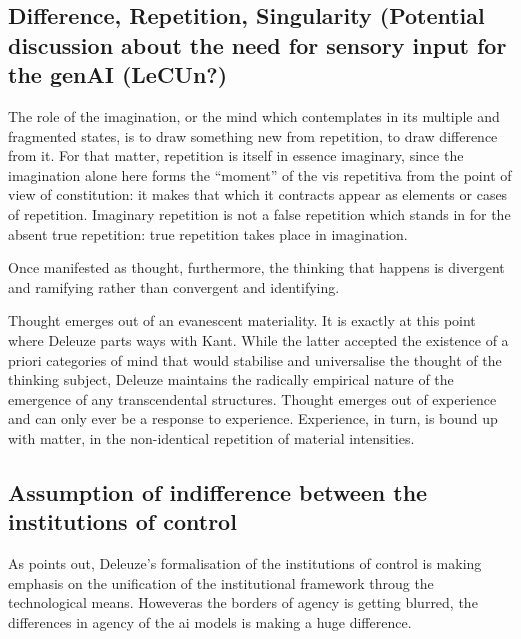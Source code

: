 \subsection{Difference, Repetition, Singularity (Potential discussion about the
	need for sensory input for the genAI (LeCUn?)}
The role of the imagination, or the mind which contemplates in its multiple and fragmented states, is to draw something new from repetition, to draw difference from it. For that matter, repetition is itself in essence imaginary, since the imagination alone here forms the “moment” of the vis repetitiva from the point of view of constitution: it makes that which it contracts appear as elements or cases of repetition. Imaginary repetition is not a false repetition which stands in for the absent true repetition: true repetition takes place in imagination. \cite{deleuze1994, kruger2021}

Once manifested as thought, furthermore, the thinking that happens is divergent and ramifying rather than convergent and identifying. \cite[175]{kruger2021}

Thought emerges out of an evanescent materiality. It is exactly at this point where Deleuze parts ways with Kant. While the latter accepted the existence of a priori categories of mind that would stabilise and universalise the thought of the thinking subject, Deleuze maintains the radically empirical nature of the emergence of any transcendental structures. Thought emerges out of experience and can only ever be a response to experience. Experience, in turn, is bound up with matter, in the non-identical repetition of material intensities. \cite[178]{kruger2021}


\subsection{Assumption of indifference between the institutions of control}

As \cite[13]{mackenzie2021} points out, Deleuze's formalisation of the
institutions of control is making emphasis on the unification of the
institutional framework throug the technological means. Howeveras the borders
of agency is getting blurred, the differences in agency of the \gls{ai} models
is making a huge difference.
